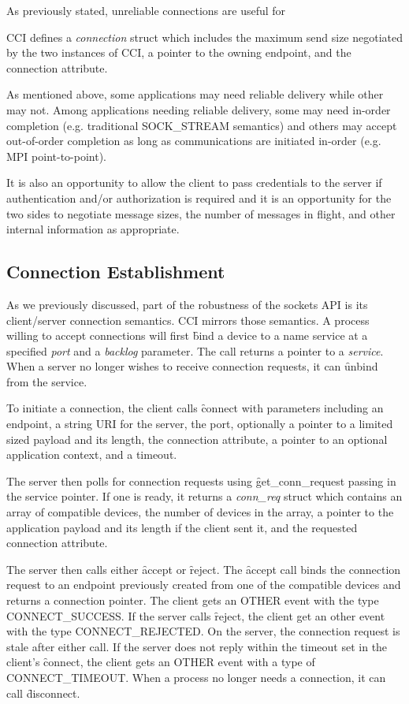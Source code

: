 As previously stated, unreliable connections are useful for 



CCI defines a \emph{connection} struct which includes the maximum send size negotiated by
the two instances of CCI, a pointer to the owning endpoint, and the connection attribute.

As mentioned above, some applications may need reliable delivery while other may not.
Among applications needing reliable delivery, some may need in-order completion (e.g.
traditional SOCK\_STREAM semantics) and others may accept out-of-order completion as long
as communications are initiated in-order (e.g. MPI point-to-point).



It is also an opportunity to allow the client to pass credentials to the
server if authentication and/or authorization is required and it is an opportunity for the
two sides to negotiate message sizes, the number of messages in flight, and other internal
information as appropriate.

\subsection{Connection Establishment}
As we previously discussed, part of the robustness of the sockets API is its client/server
connection semantics. CCI mirrors those semantics. A process willing to accept connections
will first \f{bind} a device to a name service at a specified \emph{port} and a
\emph{backlog} parameter. The call returns a pointer to a \emph{service}. When a server no
longer wishes to receive connection requests, it can \f{unbind} from the service.

To initiate a connection, the client calls \f{connect} with parameters including an
endpoint, a string URI for the server, the port, optionally a pointer to a limited sized
payload and its length, the connection attribute, a pointer to an optional application
context, and a timeout.

The server then polls for connection requests using \f{get\_conn\_request} passing in the
service pointer. If one is ready, it returns a \emph{conn\_req} struct which contains an
array of compatible devices, the number of devices in the array, a pointer to the
application payload and its length if the client sent it, and the requested connection
attribute.

The server then calls either \f{accept} or \f{reject}. The \f{accept} call binds the
connection request to an endpoint previously created from one of the compatible devices
and returns a connection pointer. The client gets an OTHER event with the type
CONNECT\_SUCCESS. If the server calls \f{reject}, the client get an other event with the
type CONNECT\_REJECTED.  On the server, the connection request is stale after either call.
If the server does not reply within the timeout set in the client's \f{connect}, the
client gets an OTHER event with a type of CONNECT\_TIMEOUT. When a process no longer needs
a connection, it can call \f{disconnect}.

